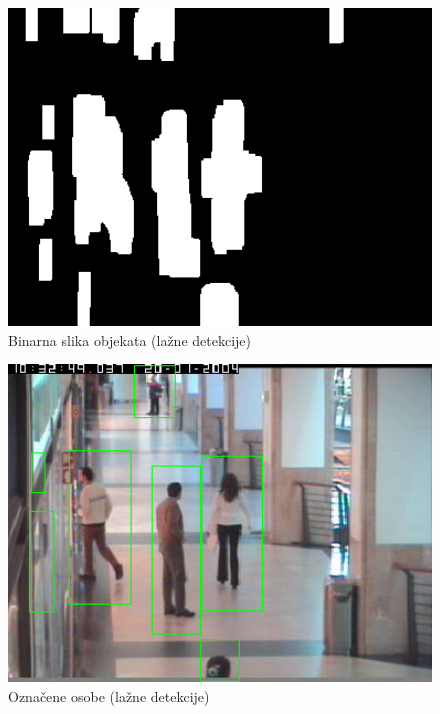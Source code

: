 \documentclass[utf8, seminar, numeric, times]{fer}
\begin{document}
\begin{figure}
\centering
\includegraphics[width=1\textwidth]{lazna_fore.png}
\caption{Binarna slika objekata (lažne detekcije)}
\label{lazna_detekt}
\end{figure}

\begin{figure}
\centering
\includegraphics[width=1\textwidth]{lazna_detekt.png}
\caption{Označene osobe (lažne detekcije)}
\label{lazna_detekt}
\end{figure}

\end{document}
